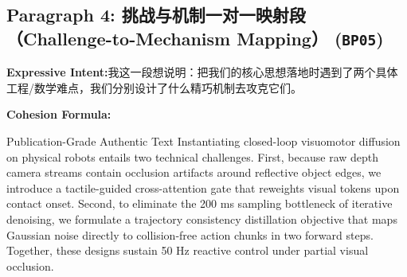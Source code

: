 \subsection*{Paragraph 4: 挑战与机制一对一映射段（Challenge-to-Mechanism Mapping） (\texttt{BP05})}
\noindent\textbf{Expressive Intent:}\enspace 我这一段想说明：把我们的核心思想落地时遇到了两个具体工程/数学难点，我们分别设计了什么精巧机制去攻克它们。\par
\noindent\textbf{Cohesion Formula:}\par\vspace{4pt}
\begin{ExampleBox}{Publication-Grade Authentic Text}
Instantiating closed-loop visuomotor diffusion on physical robots entails two technical challenges. First, because raw depth camera streams contain occlusion artifacts around reflective object edges, we introduce a tactile-guided cross-attention gate that reweights visual tokens upon contact onset. Second, to eliminate the 200 ms sampling bottleneck of iterative denoising, we formulate a trajectory consistency distillation objective that maps Gaussian noise directly to collision-free action chunks in two forward steps. Together, these designs sustain 50 Hz reactive control under partial visual occlusion.
\end{ExampleBox}
